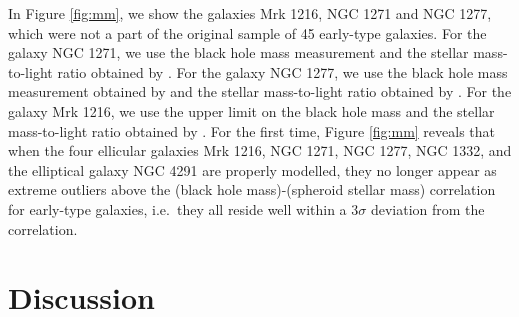 \documentclass[useAMS,usenatbib,article]{mnras}
\begin{document}
In Figure \ref{fig:mm}, we show the galaxies Mrk 1216, NGC 1271 and NGC 1277, 
which were not a part of the original sample of 45 early-type galaxies.
For the galaxy NGC 1271, we use the black hole mass measurement 
and the stellar mass-to-light ratio obtained by \cite{walsh2015}. 
For the galaxy NGC 1277, we use the black hole mass measurement obtained by \cite{vandenbosch2012} 
and the stellar mass-to-light ratio obtained by \cite{martinnavarro2015}. 
For the galaxy Mrk 1216, we use the upper limit on the black hole mass 
and the stellar mass-to-light ratio obtained by \cite{yildirim2015}. 
For the first time, Figure \ref{fig:mm} reveals that when the four ellicular galaxies Mrk 1216, NGC 1271, NGC 1277, NGC 1332, 
and the elliptical galaxy NGC 4291 are properly modelled, 
they no longer appear as extreme outliers above the (black hole mass)-(spheroid stellar mass) correlation for early-type galaxies, 
i.e.~they all reside well within a $3\sigma$ deviation from the correlation.


\section{Discussion}
\label{sec:disc}
\end{document}
